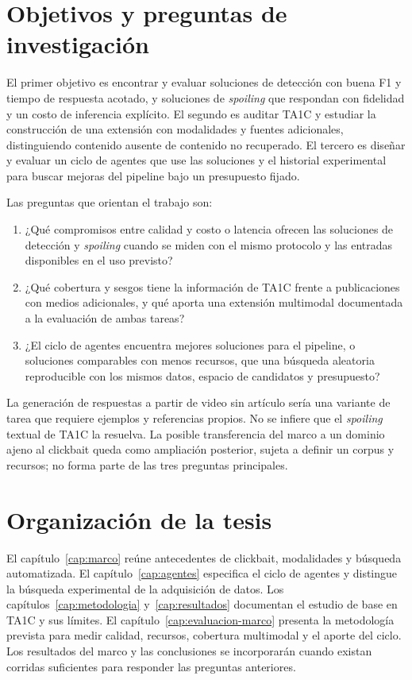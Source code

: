 \section{Objetivos y preguntas de investigación}

El primer objetivo es encontrar y evaluar soluciones de detección con buena F1 y tiempo de respuesta acotado, y soluciones de \emph{spoiling} que respondan con fidelidad y un costo de inferencia explícito. El segundo es auditar TA1C y estudiar la construcción de una extensión con modalidades y fuentes adicionales, distinguiendo contenido ausente de contenido no recuperado. El tercero es diseñar y evaluar un ciclo de agentes que use las soluciones y el historial experimental para buscar mejoras del pipeline bajo un presupuesto fijado.

Las preguntas que orientan el trabajo son:
\begin{enumerate}
  \item ¿Qué compromisos entre calidad y costo o latencia ofrecen las soluciones de detección y \emph{spoiling} cuando se miden con el mismo protocolo y las entradas disponibles en el uso previsto?
  \item ¿Qué cobertura y sesgos tiene la información de TA1C frente a publicaciones con medios adicionales, y qué aporta una extensión multimodal documentada a la evaluación de ambas tareas?
  \item ¿El ciclo de agentes encuentra mejores soluciones para el pipeline, o soluciones comparables con menos recursos, que una búsqueda aleatoria reproducible con los mismos datos, espacio de candidatos y presupuesto?
\end{enumerate}

La generación de respuestas a partir de video sin artículo sería una variante de tarea que requiere ejemplos y referencias propios. No se infiere que el \emph{spoiling} textual de TA1C la resuelva. La posible transferencia del marco a un dominio ajeno al clickbait queda como ampliación posterior, sujeta a definir un corpus y recursos; no forma parte de las tres preguntas principales.

\section{Organización de la tesis}

El capítulo~\ref{cap:marco} reúne antecedentes de clickbait, modalidades y búsqueda automatizada. El capítulo~\ref{cap:agentes} especifica el ciclo de agentes y distingue la búsqueda experimental de la adquisición de datos. Los capítulos~\ref{cap:metodologia} y~\ref{cap:resultados} documentan el estudio de base en TA1C y sus límites. El capítulo~\ref{cap:evaluacion-marco} presenta la metodología prevista para medir calidad, recursos, cobertura multimodal y el aporte del ciclo. Los resultados del marco y las conclusiones se incorporarán cuando existan corridas suficientes para responder las preguntas anteriores.

